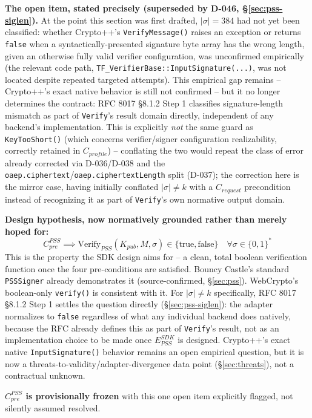 \documentclass[11pt,a4paper]{article}
\begin{document}
\textbf{The open item, stated precisely (superseded by D-046, \S\ref{sec:pss-siglen}).} At the point this section was first drafted, $|\sigma|=384$ had not yet been classified: whether Crypto++'s \texttt{VerifyMessage()} raises an exception or returns \texttt{false} when a syntactically-presented signature byte array has the wrong length, given an otherwise fully valid verifier configuration, was unconfirmed empirically (the relevant code path, \texttt{TF\_VerifierBase::InputSignature(...)}, was not located despite repeated targeted attempts). This empirical gap remains -- Crypto++'s exact native behavior is still not confirmed -- but it no longer determines the contract: RFC 8017 \S8.1.2 Step 1 classifies signature-length mismatch as part of \texttt{Verify}'s result domain directly, independent of any backend's implementation. This is explicitly \emph{not} the same guard as \texttt{KeyTooShort()} (which concerns verifier/signer configuration realizability, correctly retained in $C_{profile}$) -- conflating the two would repeat the class of error already corrected via D-036/D-038 and the \texttt{oaep.ciphertext}/\texttt{oaep.ciphertextLength} split (D-037); the correction here is the mirror case, having initially conflated $|\sigma|\neq k$ with a $C_{request}$ precondition instead of recognizing it as part of \texttt{Verify}'s own normative output domain.

\textbf{Design hypothesis, now normatively grounded rather than merely hoped for:}
\[C_{pre}^{PSS} \implies \text{Verify}_{PSS}(K_{pub}, M, \sigma) \in \{\text{true}, \text{false}\} \quad \forall \sigma \in \{0,1\}^*\]
This is the property the SDK design aims for -- a clean, total boolean verification function once the four pre-conditions are satisfied. Bouncy Castle's standard \texttt{PSSSigner} already demonstrates it (source-confirmed, \S\ref{sec:pss}). WebCrypto's boolean-only \texttt{verify()} is consistent with it. For $|\sigma| \neq k$ specifically, RFC 8017 \S8.1.2 Step 1 settles the question directly (\S\ref{sec:pss-siglen}): the adapter normalizes to \texttt{false} regardless of what any individual backend does natively, because the RFC already defines this as part of \texttt{Verify}'s result, not as an implementation choice to be made once $E_{PSS}^{SDK}$ is designed. Crypto++'s exact native \texttt{InputSignature()} behavior remains an open empirical question, but it is now a threats-to-validity/adapter-divergence data point (\S\ref{sec:threats}), not a contractual unknown.

\textbf{$C_{pre}^{PSS}$ is provisionally frozen} with this one open item explicitly flagged, not silently assumed resolved.
\end{document}
